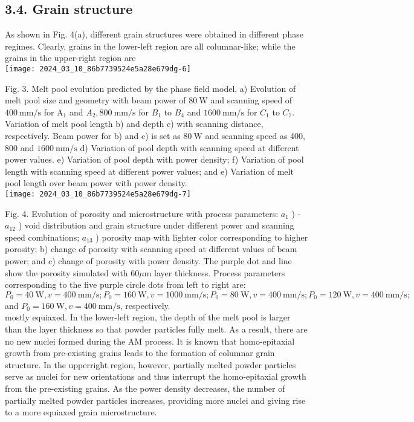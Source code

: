 \documentclass[10pt]{article}
\begin{document}
\subsection*{3.4. Grain structure}
As shown in Fig. 4(a), different grain structures were obtained in different phase regimes. Clearly, grains in the lower-left region are all columnar-like; while the grains in the upper-right region are\\
\texttt{[image: 2024\_03\_10\_86b7739524e5a28e679dg-6]}

Fig. 3. Melt pool evolution predicted by the phase field model. a) Evolution of melt pool size and geometry with beam power of $80 \mathrm{~W}$ and scanning speed of $400 \mathrm{~mm} / \mathrm{s}$ for $\mathrm{A}_{1}$ and $A_{2}, 800 \mathrm{~mm} / \mathrm{s}$ for $B_{1}$ to $B_{4}$ and $1600 \mathrm{~mm} / \mathrm{s}$ for $C_{1}$ to $C_{7}$. Variation of melt pool length b) and depth c) with scanning distance, respectively. Beam power for b) and c) is set as $80 \mathrm{~W}$ and scanning speed as 400, 800 and $1600 \mathrm{~mm} / \mathrm{s}$ d) Variation of pool depth with scanning speed at different power values. e) Variation of pool depth with power density; f) Variation of pool length with scanning speed at different power values; and e) Variation of melt pool length over beam power with power density.\\
\texttt{[image: 2024\_03\_10\_86b7739524e5a28e679dg-7]}

Fig. 4. Evolution of porosity and microstructure with process parameters: $a_{1}$ ) - $a_{12}$ ) void distribution and grain structure under different power and scanning speed combinations; $a_{13}$ ) porosity map with lighter color corresponding to higher porosity; b) change of porosity with scanning speed at different values of beam power; and c) change of porosity with power density. The purple dot and line show the porosity simulated with $60 \mu \mathrm{m}$ layer thickness. Process parameters corresponding to the five purple circle dots from left to right are: $P_{0}=40 \mathrm{~W}, v=400 \mathrm{~mm} / \mathrm{s} ; P_{0}=160 \mathrm{~W}, v=1000 \mathrm{~mm} / \mathrm{s} ; P_{0}=80 \mathrm{~W}, v=400 \mathrm{~mm} / \mathrm{s} ; P_{0}=120 \mathrm{~W}, v=400 \mathrm{~mm} / \mathrm{s} ;$ and $P_{0}=160 \mathrm{~W}, v=400 \mathrm{~mm} / \mathrm{s}$, respectively.\\
mostly equiaxed. In the lower-left region, the depth of the melt pool is larger than the layer thickness so that powder particles fully melt. As a result, there are no new nuclei formed during the AM process. It is known that homo-epitaxial growth from pre-existing grains leads to the formation of columnar grain structure. In the upperright region, however, partially melted powder particles serve as nuclei for new orientations and thus interrupt the homo-epitaxial growth from the pre-existing grains. As the power density decreases, the number of partially melted powder particles increases, providing more nuclei and giving rise to a more equiaxed grain microstructure.
\end{document}
